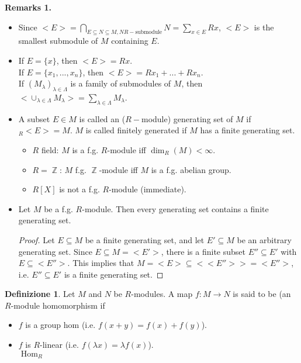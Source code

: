 \documentclass[12pt,a4paper]{report}
\theoremstyle{definition}
\newtheorem{defn}[teo]{Definizione}  %
\theoremstyle{num.custom-title}
\DeclareMathOperator{\Hom}{Hom}
\DeclareMathOperator{\Z}{\mathbb{Z}}
\DeclareMathOperator{\sse}{\subseteq}
\begin{document}
\textbf{Remarks 1.} 
\begin{itemize}
\item Since $<E>= \bigcap_{E \sse N \sse M, N R-\text{submodule}} N = \sum_{x \in E} Rx$, $<E>$ is the smallest submodule of $M$ containing $E$.
\item If $E=\{x\}$, then $<E>=Rx$.\\
If $E=\{x_1,...,x_n\}$, then $<E>=Rx_1+...+Rx_n$.\\
If $(M_\lambda)_{\lambda \in \Lambda}$ is a family of submodules of $M$, then $<\cup_{\lambda \in \Lambda} M_\lambda > = \sum_{\lambda \in \Lambda} M_\lambda$.
\item A subset $E \in M$ is called an ($R-$module) generating set of $M$ if $_R <E>=M$. $M$ is called finitely generated if $M$ has a finite generating set.
\begin{itemize}
\item $R$ field: $M$ is a f.g. $R$-module iff $\dim_R(M)<\infty$.
\item $R=\Z$: $M$ f.g. $\Z$-module iff $M$ is a f.g. abelian group.
\item $R[X]$ is not a f.g. $R$-module (immediate).
\end{itemize}
\item Let $M$ be a f.g. $R$-module. Then every generating set contains a finite generating set.
\begin{proof}
Let $E \sse M$ be a finite generating set, and let $E' \sse M$ be an arbitrary generating set. Since $E \sse M = <E'>$, there is a finite subset $E'' \sse E'$ with $E \sse <E''>$. This implies that $M=<E> \sse <<E''>>=<E''>$, i.e. $E'' \sse E'$ is a finite generating set.
\end{proof}
\end{itemize}

\begin{defn}
Let $M$ and $N$ be $R$-modules. A map $f: M \to N$ is said to be (an $R$-module homomorphism if 
\begin{itemize}
\item $f$ is a group hom (i.e. $f(x+y)=f(x)+f(y)$).
\item $f$ is $R$-linear (i.e. $f(\lambda x)=\lambda f(x)$).\\
$\Hom_R$
\end{itemize}
\end{defn}
\end{document}
